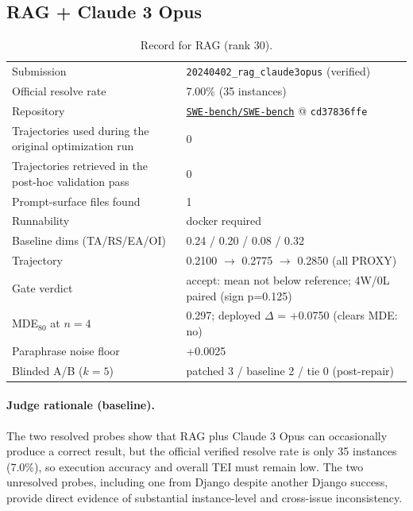 \subsection{RAG + Claude 3 Opus}
\label{app:agent30}
\begin{table}[H]\centering\scriptsize
\caption{Record for RAG (rank 30).}
\begin{tabular}{lp{8.2cm}}\toprule
Submission & \texttt{20240402\_\allowbreak{}rag\_\allowbreak{}claude3opus} (verified) \\
Official resolve rate & 7.00\% (35 instances) \\
Repository & \href{https://github.com/SWE-bench/SWE-bench}{\texttt{SWE-bench/SWE-bench}} @ \texttt{cd37836ffe} \\
Trajectories used during the original optimization run & 0 \\
Trajectories retrieved in the post-hoc validation pass & 0 \\
Prompt-surface files found & 1 \\
Runnability & docker required \\
Baseline dims (TA/RS/EA/OI) & 0.24 / 0.20 / 0.08 / 0.32 \\
Trajectory & 0.2100 $\to$ 0.2775 $\to$ 0.2850 (all PROXY) \\
Gate verdict & accept: mean not below reference; 4W/0L paired (sign p=0.125) \\
MDE$_{80}$ at $n{=}4$ & 0.297; deployed $\Delta$ = +0.0750 (clears MDE: no) \\
Paraphrase noise floor & +0.0025 \\
Blinded A/B ($k{=}5$) & patched 3 / baseline 2 / tie 0 (post-repair) \\
\bottomrule\end{tabular}\end{table}
\paragraph{Judge rationale (baseline).}
The two resolved probes show that RAG plus Claude 3 Opus can occasionally produce a correct result, but the official verified resolve rate is only 35 instances (7.0\%), so execution accuracy and overall TEI must remain low. The two unresolved probes, including one from Django despite another Django success, provide direct evidence of substantial instance-level and cross-issue inconsistency.
